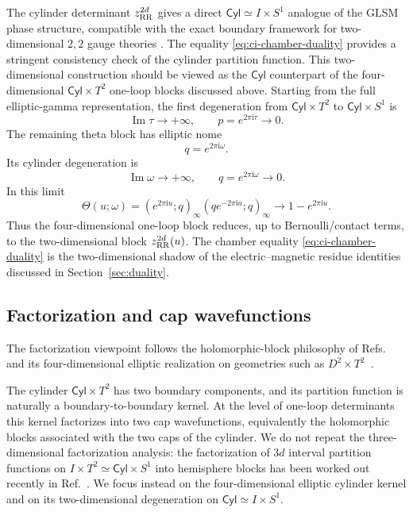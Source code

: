 \documentclass[11pt,a4paper]{article}
\numberwithin{equation}{section}
\theoremstyle{plain}
\theoremstyle{definition}
\theoremstyle{remark}
\newcommand{\ii}{\mathrm{i}}
\newcommand{\cyl}{\mathsf{Cyl}}
\begin{document}
The cylinder determinant \(z_{\rm RR}^{2d}\) gives a direct \(\cyl\simeq I\times S^1\) analogue of the GLSM phase structure, compatible with the exact boundary framework for two-dimensional \(2,2\) gauge theories \cite{Hori:2013ika}. The equality \eqref{eq:ci-chamber-duality} provides a stringent consistency check of the cylinder partition function. This two-dimensional construction should be viewed as the \(\cyl\) counterpart of the four-dimensional \(\cyl\times T^2\) one-loop blocks discussed above. Starting from the full elliptic-gamma representation, the first degeneration from \(\cyl\times T^2\) to \(\cyl\times S^1\) is
\begin{equation}
\operatorname{Im}\tau\to+\infty,
\qquad
p=e^{2\pi \ii\tau}\to0.
\end{equation}
The remaining theta block has elliptic nome
\begin{equation}
q=e^{2\pi \ii\omega}.
\end{equation}
Its cylinder degeneration is
\begin{equation}
\operatorname{Im}\omega\to+\infty,
\qquad
q=e^{2\pi \ii\omega}\to0.
\end{equation}
In this limit
\begin{equation}
\Theta(u;\omega)=(e^{2\pi \ii u};q)_\infty(qe^{-2\pi \ii u};q)_\infty
\longrightarrow
1-e^{2\pi \ii u}.
\end{equation}
Thus the four-dimensional one-loop block reduces, up to Bernoulli/contact terms, to the two-dimensional block \(z_{\rm RR}^{2d}(u)\). The chamber equality \eqref{eq:ci-chamber-duality} is the two-dimensional shadow of the electric--magnetic residue identities discussed in Section~\ref{sec:duality}.


\subsection{Factorization and cap wavefunctions}
\label{sec:factorization-half-blocks}

The factorization viewpoint follows the holomorphic-block philosophy of Refs.~\cite{Pasquetti:2011fj,Beem:2012mb,Nieri:2013yra,Nieri:2013vba,Nieri:2015yia} and its four-dimensional elliptic realization on geometries such as \(D^2\times T^2\)~\cite{Longhi:2019hdh}.

The cylinder \(\cyl\times T^2\) has two boundary components, and its partition function is naturally a boundary-to-boundary kernel. At the level of one-loop determinants this kernel factorizes into two cap wavefunctions, equivalently the holomorphic blocks associated with the two caps of the cylinder. We do not repeat the three-dimensional factorization analysis: the factorization of \(3d\) interval partition functions on \(I\times T^2\simeq \cyl\times S^1\) into hemisphere blocks has been worked out recently in Ref.~\cite{Zhao:2025ixe}. We focus instead on the four-dimensional elliptic cylinder kernel and on its two-dimensional degeneration on \(\cyl\simeq I\times S^1\).
\end{document}
